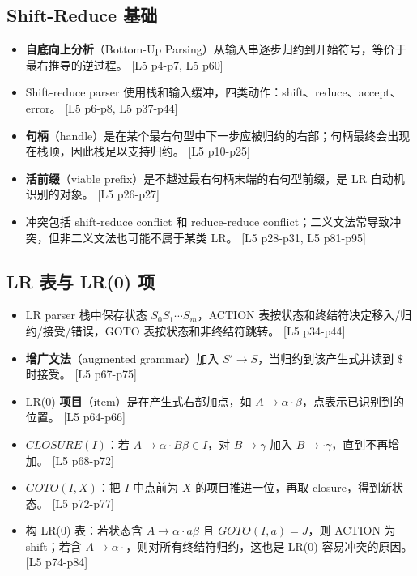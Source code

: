 \documentclass[UTF8,fontset=none,11pt]{ctexart}
\newcommand{\pg}[1]{{\scriptsize\textcolor{citegray}{[#1]}}}
\newcommand{\term}[2]{\textbf{#1}（#2）}
\begin{document}
\subsection{Shift-Reduce 基础}

\begin{itemize}
  \item \term{自底向上分析}{Bottom-Up Parsing}从输入串逐步归约到开始符号，等价于最右推导的逆过程。 \pg{L5 p4-p7, L5 p60}
  \item Shift-reduce parser 使用栈和输入缓冲，四类动作：shift、reduce、accept、error。 \pg{L5 p6-p8, L5 p37-p44}
  \item \term{句柄}{handle}是在某个最右句型中下一步应被归约的右部；句柄最终会出现在栈顶，因此栈足以支持归约。 \pg{L5 p10-p25}
  \item \term{活前缀}{viable prefix}是不越过最右句柄末端的右句型前缀，是 LR 自动机识别的对象。 \pg{L5 p26-p27}
  \item 冲突包括 shift-reduce conflict 和 reduce-reduce conflict；二义文法常导致冲突，但非二义文法也可能不属于某类 LR。 \pg{L5 p28-p31, L5 p81-p95}
\end{itemize}

\subsection{LR 表与 LR(0) 项}

\begin{itemize}
  \item LR parser 栈中保存状态 \(S_0S_1\cdots S_m\)，ACTION 表按状态和终结符决定移入/归约/接受/错误，GOTO 表按状态和非终结符跳转。 \pg{L5 p34-p44}
  \item \term{增广文法}{augmented grammar}加入 \(S'\to S\)，当归约到该产生式并读到 \(\$\) 时接受。 \pg{L5 p67-p75}
  \item LR(0) \term{项目}{item}是在产生式右部加点，如 \(A\to\alpha\cdot\beta\)，点表示已识别到的位置。 \pg{L5 p64-p66}
  \item \(CLOSURE(I)\)：若 \(A\to\alpha\cdot B\beta\in I\)，对 \(B\to\gamma\) 加入 \(B\to\cdot\gamma\)，直到不再增加。 \pg{L5 p68-p72}
  \item \(GOTO(I,X)\)：把 \(I\) 中点前为 \(X\) 的项目推进一位，再取 closure，得到新状态。 \pg{L5 p72-p77}
  \item 构 LR(0) 表：若状态含 \(A\to\alpha\cdot a\beta\) 且 \(GOTO(I,a)=J\)，则 ACTION 为 shift；若含 \(A\to\alpha\cdot\)，则对所有终结符归约，这也是 LR(0) 容易冲突的原因。 \pg{L5 p74-p84}
\end{itemize}
\end{document}
